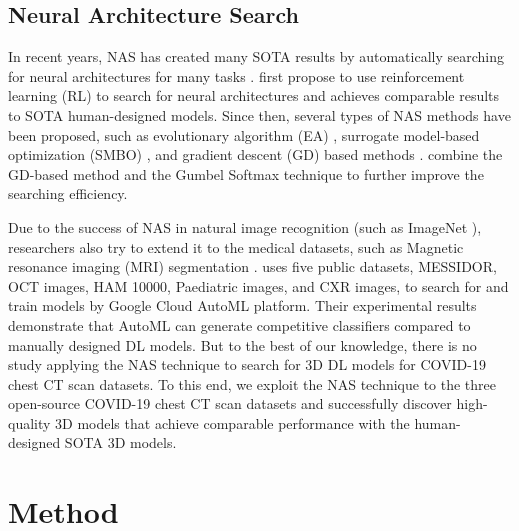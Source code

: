\documentclass[letterpaper]{article}
\begin{document}
\subsection{Neural Architecture Search}
In recent years, NAS has created many SOTA results by automatically searching for neural architectures for many tasks \cite{automl_survey,nas_survey}. \cite{nas2016,nasnet_zoph17} first propose to use reinforcement learning (RL) to search for neural architectures and achieves comparable results to SOTA human-designed models. Since then, several types of NAS methods have been proposed, such as evolutionary
algorithm (EA) \cite{amoebanet}, surrogate model-based optimization (SMBO) \cite{pnas_liu18}, and gradient descent (GD) based methods \cite{darts,gdas}. \cite{gdas,fbnet} combine the GD-based method and the Gumbel Softmax \cite{Gumbel_Softmax} technique to further improve the searching efficiency.

Due to the success of NAS in natural image recognition (such as ImageNet \cite{deng2009imagenet}), researchers also try to extend it to the medical datasets, such as Magnetic resonance imaging (MRI) segmentation \cite{scalableNAS}. \cite{Faes2019} uses five public datasets, MESSIDOR, OCT images, HAM 10000, Paediatric images, and CXR images, to search for and train models by Google Cloud AutoML platform. Their experimental results demonstrate that AutoML can generate competitive classifiers compared to manually designed DL models. But to the best of our knowledge, there is no study applying the NAS technique to search for 3D DL models for COVID-19 chest CT scan datasets. To this end, we exploit the NAS technique to the three open-source COVID-19 chest CT scan datasets and successfully discover high-quality 3D models that achieve comparable performance with the human-designed SOTA 3D models.








\section{Method}
\label{section:method}
\end{document}
